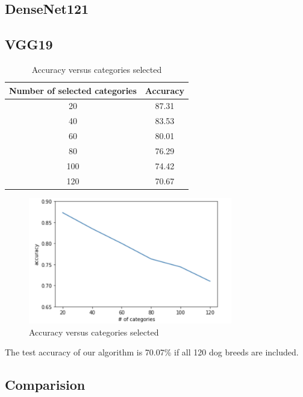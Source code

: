 \documentclass{article}
\begin{document}
\subsection{DenseNet121}
\subsection{VGG19}
\begin{table}[h]
	\centering
	
	\begin{tabular}{|c|c|}
		\hline
		Number of selected categories & Accuracy \\\hline
		20 & 87.31\\
		40 & 83.53\\
		60 & 80.01\\
		80 & 76.29\\
		100 & 74.42\\
		120 & 70.67\\
		\hline
	\end{tabular}
\caption{Accuracy versus categories selected}
\end{table}
\begin{figure}[H]
	\centering
	\includegraphics[width=3.5in]{pics/vgg19_1} 
	\caption{Accuracy versus categories selected}
\end{figure}
The test accuracy of our algorithm is 70.07\% if all 120 dog breeds are included. 
\subsection{Comparision}

\newpage
\end{document}
